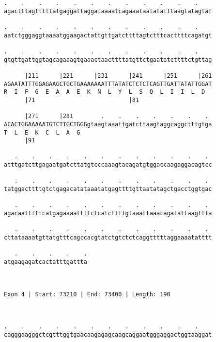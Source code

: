 \documentclass{article}
\begin{document}
\begin{Verbatim}
.    .    .    .    .    .    .    .    .    .    .    .    
agactttagtttttatgaggattaggataaaatcagaaataatatatttaagtatagtat
                                                            
.    .    .    .    .    .    .    .    .    .    .    .    
aatctgggaggtaaaatggaagactattgttgatcttttagtctttcacttttcagatgt
                                                            
.    .    .    .    .    .    .    .    .    .    .    .    
gtgttgattggtagcagaaagtgaaactaacttttatgttctgaatatcttttctgttag
                                                            
      |211      |221      |231      |241      |251      |261
AGAATATTTGGAGAAGCTGCTGAAAAAAATTTATATCTCTCTCAGTTGATTATATTGGAT
R  I  F  G  E  A  A  E  K  N  L  Y  L  S  Q  L  I  I  L  D  
      |71                           |81                     
  
      |271      |281        .    .    .    .    .    .    . 
ACACTGGAAAAATGTCTTGCTGGGgtaagtaaattgatcttaagtaggcaggctttgtga
T  L  E  K  C  L  A  G                                      
      |91                                                   
  
   .    .    .    .    .    .    .    .    .    .    .    . 
atttgatcttgagaatgatcttatgtcccaaagtacagatgtggaccaagaggacagtcc
                                                            
   .    .    .    .    .    .    .    .    .    .    .    . 
tatggacttttgtctgagacatataaatatgagttttgttaatatagctgacctggtgac
                                                            
   .    .    .    .    .    .    .    .    .    .    .    . 
agacaatttttcatgagaaaattttctcatcttttgtaaattaaacagatattaagttta
                                                            
   .    .    .    .    .    .    .    .    .    .    .    . 
cttataaaatgttatgtttcagccacgtatctgtctctcaggtttttaggaaaatatttt
                                                            
   .    .    .    .    .
atgaagagatcactatttgattta
                        
                        
 
Exon 4 | Start: 73210 | End: 73400 | Length: 190



.    .    .    .    .    .    .    .    .    .    .    .    
cagggaagggctcgtttggtgaacaagagagcaagcaggaatgggaggactggtaaggat
                                                            

\end{Verbatim}
\end{document}
